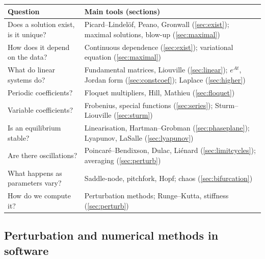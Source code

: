 \documentclass[11pt,a4paper]{article}
\numberwithin{equation}{section}
\theoremstyle{definition}
\begin{document}
\begin{center}
\renewcommand{\arraystretch}{1.25}
\small
\begin{tabular}{p{5.2cm}p{7.4cm}}
\hline
Question & Main tools (sections)\\
\hline
Does a solution exist, is it unique? & Picard--Lindel\"of, Peano, Gronwall (\ref{sec:exist}); maximal solutions, blow-up (\ref{sec:maximal})\\
How does it depend on the data? & Continuous dependence (\ref{sec:exist}); variational equation (\ref{sec:maximal})\\
What do linear systems do? & Fundamental matrices, Liouville (\ref{sec:linear}); $e^{At}$, Jordan form (\ref{sec:constcoef}); Laplace (\ref{sec:higher})\\
Periodic coefficients? & Floquet multipliers, Hill, Mathieu (\ref{sec:floquet})\\
Variable coefficients? & Frobenius, special functions (\ref{sec:series}); Sturm--Liouville (\ref{sec:sturm})\\
Is an equilibrium stable? & Linearisation, Hartman--Grobman (\ref{sec:phaseplane}); Lyapunov, LaSalle (\ref{sec:lyapunov})\\
Are there oscillations? & Poincar\'e--Bendixson, Dulac, Li\'enard (\ref{sec:limitcycles}); averaging (\ref{sec:perturb})\\
What happens as parameters vary? & Saddle-node, pitchfork, Hopf; chaos (\ref{sec:bifurcation})\\
How do we compute it? & Perturbation methods; Runge--Kutta, stiffness (\ref{sec:perturb})\\
\hline
\end{tabular}
\end{center}

\subsection{Perturbation and numerical methods in software}
\label{ssec:software14}
\end{document}
